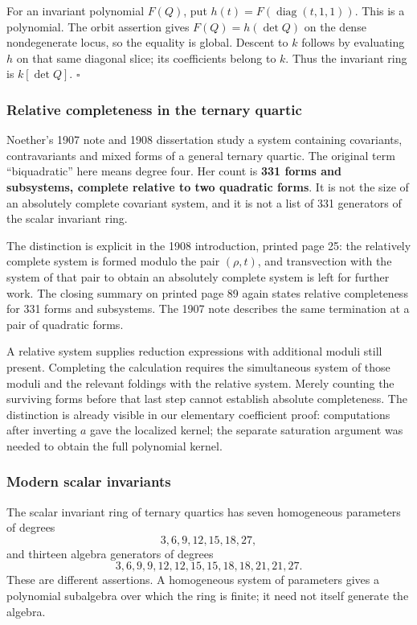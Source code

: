 \documentclass[
]{article}
\begin{document}
For an invariant polynomial \(F(Q)\), put
\(h(t)=F(\operatorname{diag}(t,1,1))\). This is a polynomial. The orbit
assertion gives \(F(Q)=h(\det Q)\) on the dense nondegenerate locus, so
the equality is global. Descent to \(k\) follows by evaluating \(h\) on
that same diagonal slice; its coefficients belong to \(k\). Thus the
invariant ring is \(k [\det Q]\). \(\square\)

\subsubsection{Relative completeness in the ternary
quartic}\label{relative-completeness-in-the-ternary-quartic}

Noether's 1907 note and 1908 dissertation study a system containing
covariants, contravariants and mixed forms of a general ternary quartic.
The original term ``biquadratic'' here means degree four. Her count is
\textbf{331 forms and subsystems, complete relative to two quadratic
forms}. It is not the size of an absolutely complete covariant system,
and it is not a list of 331 generators of the scalar invariant ring.

The distinction is explicit in the 1908 introduction, printed page 25:
the relatively complete system is formed modulo the pair \((\rho,t)\),
and transvection with the system of that pair to obtain an absolutely
complete system is left for further work. The closing summary on printed
page 89 again states relative completeness for 331 forms and subsystems.
The 1907 note describes the same termination at a pair of quadratic
forms.

A relative system supplies reduction expressions with additional moduli
still present. Completing the calculation requires the simultaneous
system of those moduli and the relevant foldings with the relative
system. Merely counting the surviving forms before that last step cannot
establish absolute completeness. The distinction is already visible in
our elementary coefficient proof: computations after inverting \(a\)
gave the localized kernel; the separate saturation argument was needed
to obtain the full polynomial kernel.

\subsubsection{Modern scalar invariants}\label{modern-scalar-invariants}

The scalar invariant ring of ternary quartics has seven homogeneous
parameters of degrees \[
3,6,9,12,15,18,27,
\] and thirteen algebra generators of degrees \[
3,6,9,9,12,12,15,15,18,18,21,21,27.
\] These are different assertions. A homogeneous system of parameters
gives a polynomial subalgebra over which the ring is finite; it need not
itself generate the algebra.
\end{document}
